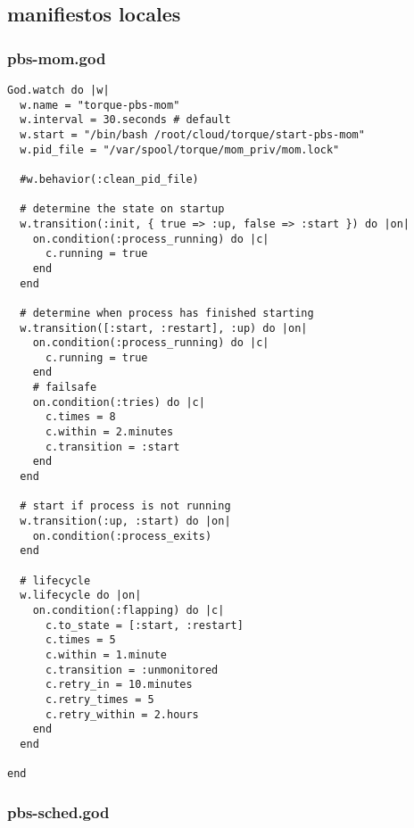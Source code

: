 \subsection{manifiestos locales}


\subsubsection{pbs-mom.god}


\begin{lstlisting}
God.watch do |w|
  w.name = "torque-pbs-mom"
  w.interval = 30.seconds # default      
  w.start = "/bin/bash /root/cloud/torque/start-pbs-mom"
  w.pid_file = "/var/spool/torque/mom_priv/mom.lock"
    
  #w.behavior(:clean_pid_file)
  
  # determine the state on startup    
  w.transition(:init, { true => :up, false => :start }) do |on|      
    on.condition(:process_running) do |c|        
      c.running = true     
    end    
  end     

  # determine when process has finished starting    
  w.transition([:start, :restart], :up) do |on|      
    on.condition(:process_running) do |c|        
      c.running = true      
    end       
    # failsafe      
    on.condition(:tries) do |c|        
      c.times = 8        
      c.within = 2.minutes        
      c.transition = :start      
    end    
  end     

  # start if process is not running    
  w.transition(:up, :start) do |on|      
    on.condition(:process_exits)    
  end     

  # lifecycle    
  w.lifecycle do |on|      
    on.condition(:flapping) do |c|        
      c.to_state = [:start, :restart]        
      c.times = 5        
      c.within = 1.minute        
      c.transition = :unmonitored        
      c.retry_in = 10.minutes        
      c.retry_times = 5        
      c.retry_within = 2.hours      
    end    
  end
  
end
\end{lstlisting}


\subsubsection{pbs-sched.god}


